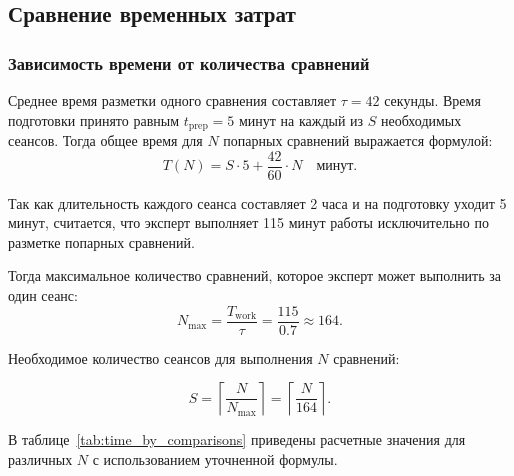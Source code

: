 \subsection{Сравнение временных затрат}%

\subsubsection{Зависимость времени от количества сравнений}

Среднее время разметки одного сравнения составляет \(\tau = 42\) секунды. 
Время подготовки принято равным \(t_{\text{prep}} = 5\) минут на каждый из $S$ необходимых сеансов.
Тогда общее время для \(N\) попарных сравнений выражается формулой:
\begin{equation}
    T(N) = S \cdot 5 + \frac{42}{60} \cdot N \quad \text{минут}.
    \label{eq:vremya}
\end{equation}

Так как длительность каждого сеанса составляет 2 часа и на подготовку уходит 5 минут, считается, что эксперт выполняет 115 минут работы исключительно по разметке попарных сравнений.

Тогда максимальное количество сравнений, которое эксперт может выполнить за один сеанс:
\begin{equation}
    N_{\text{max}} = \frac{T_{\text{work}}}{\tau} = \frac{115}{0.7} \approx 164.
    \label{eq:maxsravn}
\end{equation}

Необходимое количество сеансов для выполнения \(N\) сравнений:

\begin{equation}
    S = \left\lceil \frac{N}{N_{\text{max}}} \right\rceil = \left\lceil \frac{N}{164} \right\rceil.
    \label{eq:seans}
\end{equation}

В таблице~\ref{tab:time_by_comparisons} приведены расчетные значения для различных \(N\) с использованием уточненной формулы.

